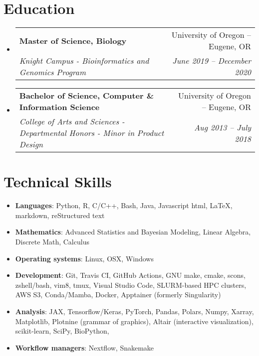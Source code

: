 \documentclass[letterpaper,11pt]{article}
\makeatletter
\newcommand{\resumeNoWrapItem}[2]{
  \item\small{
    \textbf{#1}{: #2 \vspace{-2pt}}
  }
}
\newcommand{\resumeSubheading}[4]{
  \vspace{-1pt}\item
    \begin{tabular*}{0.97\textwidth}[t]{l@{\extracolsep{\fill}}r}
      \textbf{#1} & #2 \\
      \textit{\small#3} & \textit{\small #4} \\
    \end{tabular*}\vspace{-3pt}
}
\newcommand{\resumeSubItem}[2]{\resumeNoWrapItem{#1}{#2}\vspace{-4pt}}
\newcommand{\resumeSubHeadingListStart}{\begin{itemize}[leftmargin=*]}
\newcommand{\resumeSubHeadingListEnd}{\end{itemize}}
\makeatother
\begin{document}
\section{Education}
    \resumeSubHeadingListStart
        \resumeSubheading
            {Master of Science, Biology}{University of Oregon -- Eugene, OR}
            {Knight Campus - Bioinformatics and Genomics Program}{June 2019 -- December 2020}
        \resumeSubheading
            {Bachelor of Science, Computer \& Information Science}{University of Oregon -- Eugene, OR}
            {College of Arts and Sciences - Departmental Honors - Minor in Product Design}{Aug 2013 -- July 2018}
    \resumeSubHeadingListEnd

\section{Technical Skills}

\resumeSubHeadingListStart
    \resumeSubItem{Languages}
        {
            Python, R, C/C++, Bash, Java, Javascript
            html, \LaTeX, markdown, reStructured text
        }
    \resumeSubItem{Mathematics}
        {
            Advanced Statistics and Bayesian Modeling, 
            Linear Algebra, 
            Discrete Math, 
            Calculus
        }
    \resumeSubItem{Operating systems}
        {
            Linux, OSX, Windows
        }
    \resumeSubItem{Development}
        {
            Git, Travis CI, GitHub Actions, %
            GNU make, cmake, scons, %
            zshell/bash, vim8, tmux, %
            Visual Studio Code, 
            SLURM-based HPC clusters, 
            AWS S3, %
            Conda/Mamba, %
            Docker, Apptainer (formerly Singularity) %
        }
    \resumeSubItem{Analysis}
        {
            JAX, Tensorflow/Keras, PyTorch, 
            Pandas, Polars, Numpy, Xarray, 
            Matplotlib, Plotnine (grammar of graphics), Altair (interactive visualization),
            scikit-learn, SciPy, BioPython,
        }
    \resumeSubItem{Workflow managers}
        {
            Nextflow, Snakemake
        }
\resumeSubHeadingListEnd





\end{document}
